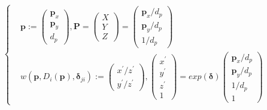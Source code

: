 \documentclass{article}
\begin{document}
\begin{CJK*}{GBK}{song}
\begin{equation}\left\{\begin{aligned}
&\boldsymbol{p}:=\begin{pmatrix}\boldsymbol{p}_x\\\boldsymbol{p}_y\\d_p\end{pmatrix} ,\boldsymbol{P}=\begin{pmatrix}X\\Y\\Z\end{pmatrix} = \begin{pmatrix}\boldsymbol{p}_x/d_p\\\boldsymbol{p}_y/d_p\\1/d_p\end{pmatrix}
\\
&w(\boldsymbol{p},D_{i}(\boldsymbol{p}),\boldsymbol{\delta}_{ji}):=\begin{pmatrix}x^{'}/z^{'}\\y^{'}/z^{'}\end{pmatrix},\begin{pmatrix}x^{'}\\y^{'}\\z^{'}\\1\end{pmatrix}=
exp(\boldsymbol{\delta})\begin{pmatrix}\boldsymbol{p}_x/d_p\\\boldsymbol{p}_y/d_p\\1/d_p\\1\end{pmatrix}
\end{aligned}\right.\tag{2.10}\end{equation}


\end{CJK*}
\end{document}
